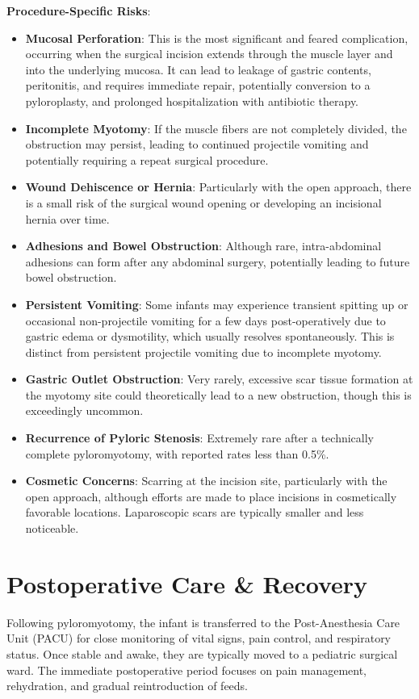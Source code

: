 \textbf{Procedure-Specific Risks}:
\begin{itemize}
  \item \textbf{Mucosal Perforation}: This is the most significant and feared complication, occurring when the surgical incision extends through the muscle layer and into the underlying mucosa. It can lead to leakage of gastric contents, peritonitis, and requires immediate repair, potentially conversion to a pyloroplasty, and prolonged hospitalization with antibiotic therapy.
  \item \textbf{Incomplete Myotomy}: If the muscle fibers are not completely divided, the obstruction may persist, leading to continued projectile vomiting and potentially requiring a repeat surgical procedure.
  \item \textbf{Wound Dehiscence or Hernia}: Particularly with the open approach, there is a small risk of the surgical wound opening or developing an incisional hernia over time.
  \item \textbf{Adhesions and Bowel Obstruction}: Although rare, intra-abdominal adhesions can form after any abdominal surgery, potentially leading to future bowel obstruction.
  \item \textbf{Persistent Vomiting}: Some infants may experience transient spitting up or occasional non-projectile vomiting for a few days post-operatively due to gastric edema or dysmotility, which usually resolves spontaneously. This is distinct from persistent projectile vomiting due to incomplete myotomy.
  \item \textbf{Gastric Outlet Obstruction}: Very rarely, excessive scar tissue formation at the myotomy site could theoretically lead to a new obstruction, though this is exceedingly uncommon.
  \item \textbf{Recurrence of Pyloric Stenosis}: Extremely rare after a technically complete pyloromyotomy, with reported rates less than 0.5\%.
  \item \textbf{Cosmetic Concerns}: Scarring at the incision site, particularly with the open approach, although efforts are made to place incisions in cosmetically favorable locations. Laparoscopic scars are typically smaller and less noticeable.
\end{itemize}

\section*{Postoperative Care \& Recovery}
Following pyloromyotomy, the infant is transferred to the Post-Anesthesia Care Unit (PACU) for close monitoring of vital signs, pain control, and respiratory status. Once stable and awake, they are typically moved to a pediatric surgical ward. The immediate postoperative period focuses on pain management, rehydration, and gradual reintroduction of feeds.

